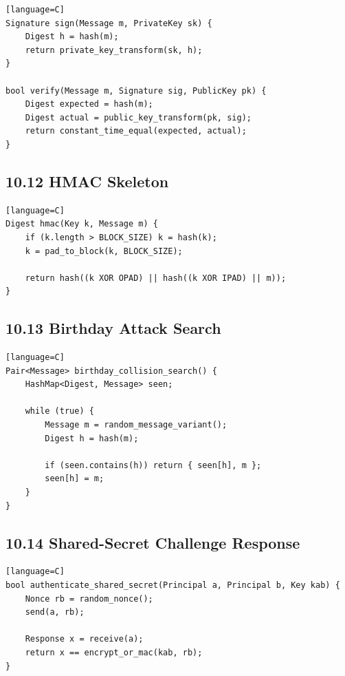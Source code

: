 \documentclass[11pt]{article}
\begin{document}
\begin{verbatim}[language=C]
Signature sign(Message m, PrivateKey sk) {
    Digest h = hash(m);
    return private_key_transform(sk, h);
}

bool verify(Message m, Signature sig, PublicKey pk) {
    Digest expected = hash(m);
    Digest actual = public_key_transform(pk, sig);
    return constant_time_equal(expected, actual);
}
\end{verbatim}

\subsection{10.12 HMAC Skeleton}\label{hmac-skeleton}

\begin{verbatim}[language=C]
Digest hmac(Key k, Message m) {
    if (k.length > BLOCK_SIZE) k = hash(k);
    k = pad_to_block(k, BLOCK_SIZE);

    return hash((k XOR OPAD) || hash((k XOR IPAD) || m));
}
\end{verbatim}

\subsection{10.13 Birthday Attack Search}\label{birthday-attack-search}

\begin{verbatim}[language=C]
Pair<Message> birthday_collision_search() {
    HashMap<Digest, Message> seen;

    while (true) {
        Message m = random_message_variant();
        Digest h = hash(m);

        if (seen.contains(h)) return { seen[h], m };
        seen[h] = m;
    }
}
\end{verbatim}

\subsection{10.14 Shared-Secret Challenge
Response}\label{shared-secret-challenge-response}

\begin{verbatim}[language=C]
bool authenticate_shared_secret(Principal a, Principal b, Key kab) {
    Nonce rb = random_nonce();
    send(a, rb);

    Response x = receive(a);
    return x == encrypt_or_mac(kab, rb);
}
\end{verbatim}
\end{document}
